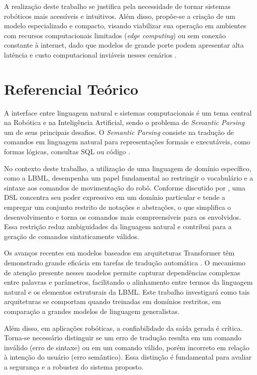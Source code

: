 \documentclass{article}
\begin{document}
A realização deste trabalho se justifica pela necessidade de tornar sistemas robóticos mais acessíveis e intuitivos. Além disso, propõe-se a criação de um modelo especializado e compacto, visando viabilizar sua operação em ambientes com recursos computacionais limitados (\textit{edge computing}) ou sem conexão constante à internet, dado que modelos de grande porte podem apresentar alta latência e custo computacional inviáveis nesses cenários \citep{Sun2019MobileBERT}.

\section{Referencial Teórico}

A interface entre linguagem natural e sistemas computacionais é um tema central na Robótica e na Inteligência Artificial, sendo o problema de \textit{Semantic Parsing} um de seus principais desafios. O \textit{Semantic Parsing} consiste na tradução de comandos em linguagem natural para representações formais e executáveis, como formas lógicas, consultas SQL ou código \citep{yu2018spider}.

No contexto deste trabalho, a utilização de uma linguagem de domínio específico, como a LBML, desempenha um papel fundamental ao restringir o vocabulário e a sintaxe aos comandos de movimentação do robô. Conforme discutido por \citet{Jimenez2017}, uma DSL concentra seu poder expressivo em um domínio particular e tende a empregar um conjunto restrito de notações e abstrações, o que simplifica o desenvolvimento e torna os comandos mais compreensíveis para os envolvidos. Essa restrição reduz ambiguidades da linguagem natural e contribui para a geração de comandos sintaticamente válidos.

Os avanços recentes em modelos baseados em arquiteturas Transformer têm demonstrado grande eficácia em tarefas de tradução automática \citep{Vaswani2017Attention}. O mecanismo de atenção presente nesses modelos permite capturar dependências complexas entre palavras e parâmetros, facilitando o alinhamento entre termos da linguagem natural e os elementos estruturais da LBML. Este trabalho investigará como tais arquiteturas se comportam quando treinadas em domínios restritos, em comparação a grandes modelos de linguagem generalistas.

Além disso, em aplicações robóticas, a confiabilidade da saída gerada é crítica. Torna-se necessário distinguir se um erro de tradução resulta em um comando inválido (erro de sintaxe) ou em um comando válido, porém incorreto em relação à intenção do usuário (erro semântico). Essa distinção é fundamental para avaliar a segurança e a robustez do sistema proposto.
\end{document}
